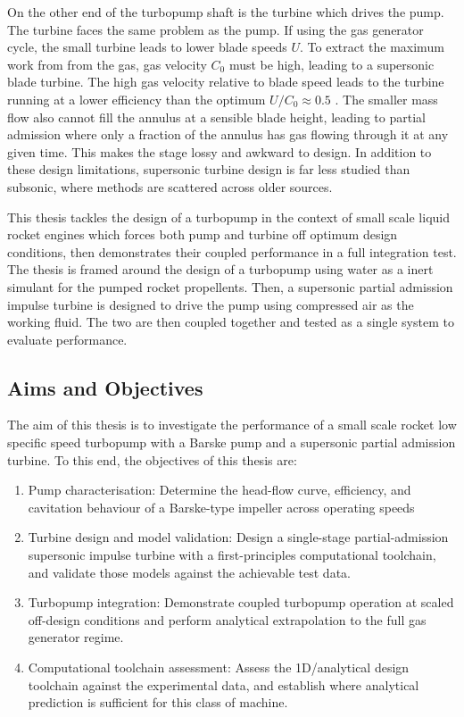 On the other end of the turbopump shaft is the turbine which drives the pump. The turbine faces the same problem as the pump. If using the gas generator cycle, the small turbine leads to lower blade speeds $U$. To extract the maximum work from from the gas, gas velocity $C_0$ must be high, leading to a supersonic blade turbine. The high gas velocity relative to blade speed leads to the turbine running at a lower efficiency than the optimum $U/C_0 \approx 0.5$ \cite{find a source}. The smaller mass flow also cannot fill the annulus at a sensible blade height, leading to partial admission where only a fraction of the annulus has gas flowing through it at any given time. This makes the stage lossy and awkward to design. In addition to these design limitations, supersonic turbine design is far less studied than subsonic, where methods are scattered across older sources. 

This thesis tackles the design of a turbopump in the context of small scale liquid rocket engines which forces both pump and turbine off optimum design conditions, then demonstrates their coupled performance in a full integration test. The thesis is framed around the design of a \valPumpRpmDesign turbopump using water as a inert simulant for the pumped rocket propellents. Then, a supersonic partial admission impulse turbine is designed to drive the pump using compressed air as the working fluid. The two are then coupled together and tested as a single system to evaluate performance.

\subsection{Aims and Objectives}
The aim of this thesis is to investigate the performance of a small scale rocket low specific speed turbopump with a Barske pump and a supersonic partial admission turbine. To this end, the objectives of this thesis are:

\begin{enumerate}
    \item Pump characterisation: Determine the head-flow curve, efficiency, and cavitation behaviour of a Barske-type impeller across operating speeds
    \item Turbine design and model validation: Design a single-stage partial-admission supersonic impulse turbine with a first-principles computational toolchain, and validate those models against the achievable test data.
    \item Turbopump integration: Demonstrate coupled turbopump operation at scaled off-design conditions and perform analytical extrapolation to the full \valPumpRpmDesign gas generator regime.
    \item Computational toolchain assessment: Assess the 1D/analytical design toolchain against the experimental data, and establish where analytical prediction is sufficient for this class of machine.
\end{enumerate}


